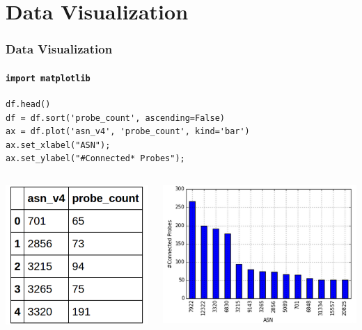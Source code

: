 \section{Data Visualization}

\begin{frame}[fragile]
  \frametitle{Data Visualization}
  \framesubtitle{\texttt{import matplotlib}}
    \begin{lstlisting}
df.head()
df = df.sort('probe_count', ascending=False)
ax = df.plot('asn_v4', 'probe_count', kind='bar')
ax.set_xlabel("ASN");
ax.set_ylabel("#Connected* Probes");
    \end{lstlisting}
    \centering
    \begin{columns}
      \begin{column}{0.45\textwidth}
        \centering
        \includegraphics[width=.45\linewidth]{figures/pandas-read-sql}\\
      \end{column}
      \begin{column}{0.55\textwidth}
        \centering
    \includegraphics[width=.55\linewidth]{figures/pandas-plot}\\
      \end{column}
    \end{columns}
\end{frame}


